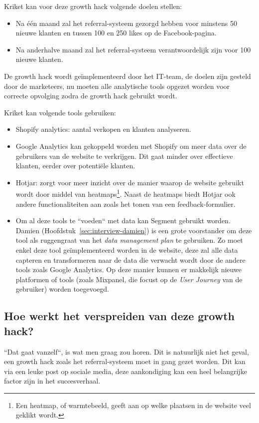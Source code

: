 Kriket kan voor deze growth hack volgende doelen stellen:
\begin{itemize}
	\item Na één maand zal het referral-systeem gezorgd hebben voor minstens 50 nieuwe klanten en tussen 100 en 250 likes op de Facebook-pagina.
	\item Na anderhalve maand zal het referral-systeem verantwoordelijk zijn voor 100 nieuwe klanten.
\end{itemize}

De growth hack wordt geïmplementeerd door het IT-team, de doelen zijn gesteld door de marketeers, nu moeten alle analytische tools opgezet worden voor correcte opvolging zodra de growth hack gebruikt wordt.

Kriket kan volgende tools gebruiken:
\begin{itemize}
	\item Shopify analytics: aantal verkopen en klanten analyseren.
	\item Google Analytics kan gekoppeld worden met Shopify om meer data over de gebruikers van de website te verkrijgen. Dit gaat minder over effectieve klanten, eerder over potentiële klanten.
	\item Hotjar: zorgt voor meer inzicht over de manier waarop de website gebruikt wordt door middel van heatmaps\footnote{Een heatmap, of warmtebeeld, geeft aan op welke plaatsen in de website veel geklikt wordt.}. Naast de heatmaps biedt Hotjar ook andere functionaliteiten aan zoals het tonen van een feedback-formulier.
	\item Om al deze tools te ``voeden`` met data kan Segment gebruikt worden. Damien (Hoofdstuk~\ref{sec:interview-damien}) is een grote voorstander om deze tool als ruggengraat van het \emph{data management plan} te gebruiken. Zo moet enkel deze tool geïmplementeerd worden in de website, deze zal alle data capteren en transformeren naar de data die verwacht wordt door de andere tools zoals Google Analytics. Op deze manier kunnen er makkelijk nieuwe platformen of tools (zoals Mixpanel, die focust op de \emph{User Journey} van de gebruiker) worden toegevoegd.
\end{itemize}

\subsection{Hoe werkt het verspreiden van deze growth hack?}
\label{subsec:growth-hack-verspreiden}
``Dat gaat vanzelf\text{!}``, is wat men graag zou horen. Dit is natuurlijk niet het geval, een growth hack zoals het referral-systeem moet in gang gezet worden. Dit kan via een leuke post op sociale media, deze aankondiging kan een heel belangrijke factor zijn in het succesverhaal. 

